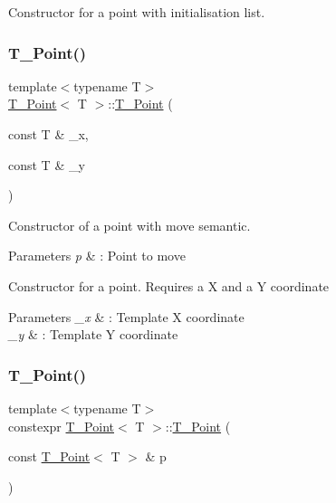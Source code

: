 Constructor for a point with initialisation list. 

\mbox{\label{classT__Point_a12f2ef3c5f10e162dcb6385bbfbfae58}} 
\subsubsection{\texorpdfstring{T\+\_\+\+Point()}{T\_Point()}\hspace{0.1cm}{\footnotesize\ttfamily [3/7]}}
{\footnotesize\ttfamily template$<$typename T$>$ \\
\hyperlink{classT__Point}{T\+\_\+\+Point}$<$ T $>$\+::\hyperlink{classT__Point}{T\+\_\+\+Point} (\begin{DoxyParamCaption}\item[{const T \&}]{\+\_\+x,  }\item[{const T \&}]{\+\_\+y }\end{DoxyParamCaption})\hspace{0.3cm}{\ttfamily [inline]}}



Constructor of a point with move semantic. 


\begin{DoxyParams}{Parameters}
{\em p} & \+: Point to move\\
\hline
\end{DoxyParams}
Constructor for a point. Requires a X and a Y coordinate 
\begin{DoxyParams}{Parameters}
{\em \+\_\+x} & \+: Template X coordinate \\
\hline
{\em \+\_\+y} & \+: Template Y coordinate \\
\hline
\end{DoxyParams}
\mbox{\label{classT__Point_af313da04154273b9a75d66e9950359ea}} 
\subsubsection{\texorpdfstring{T\+\_\+\+Point()}{T\_Point()}\hspace{0.1cm}{\footnotesize\ttfamily [4/7]}}
{\footnotesize\ttfamily template$<$typename T$>$ \\
constexpr \hyperlink{classT__Point}{T\+\_\+\+Point}$<$ T $>$\+::\hyperlink{classT__Point}{T\+\_\+\+Point} (\begin{DoxyParamCaption}\item[{const \hyperlink{classT__Point}{T\+\_\+\+Point}$<$ T $>$ \&}]{p }\end{DoxyParamCaption})\hspace{0.3cm}{\ttfamily [default]}}

